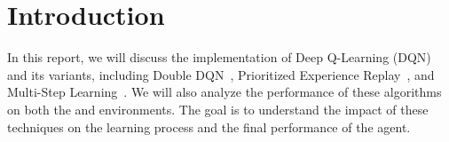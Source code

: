 \section{Introduction}
\label{sec:introduction}

In this report, we will discuss the implementation of Deep Q-Learning (DQN) and its variants, including Double DQN~\cite{vanhasselt2016deep}, Prioritized Experience Replay~\cite{schaul2016prioritized}, and Multi-Step Learning~\cite{daley2024averaging}.
We will also analyze the performance of these algorithms on both the \cartpole and \pong environments.
The goal is to understand the impact of these techniques on the learning process and the final performance of the agent.
